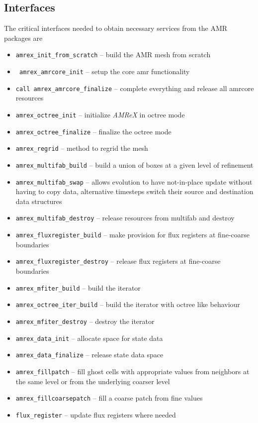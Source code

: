 \documentclass{article}
\newcommand{\code}[1]{{\tt#1}}
\newcommand{\amrex}{{\it AMReX}\xspace}
\begin{document}
\subsection{Interfaces}
\label{sec:amrex-interfaces}
The critical interfaces needed to obtain necessary services from the
AMR packages are
\begin{itemize}
\item \code{amrex\_init\_from\_scratch} -- build the AMR mesh from
  scratch
\item \code{ amrex\_amrcore\_init} -- setup the core amr functionality
\item \code{call amrex\_amrcore\_finalize} -- complete everything and
  release all amrcore resources
\item \code{amrex\_octree\_init} -- initialize \amrex in octree mode
\item \code{amrex\_octree\_finalize} -- finalize the octree mode
\item \code{amrex\_regrid} -- method to regrid the mesh
\item \code{amrex\_multifab\_build} -- build a union of boxes at a given level
of refinement
\item \code{amrex\_multifab\_swap} -- allows evolution to have
  not-in-place update without having to copy data, alternative
  timesteps switch their source and destination data structures
\item \code{amrex\_multifab\_destroy} -- release resources from multifab
  and destroy
\item \code{amrex\_fluxregister\_build} -- make provision for flux
  registers at fine-coarse boundaries
\item \code{amrex\_fluxregister\_destroy} -- release flux 
  registers at fine-coarse boundaries
\item \code{amrex\_mfiter\_build} -- build the iterator 
\item \code{amrex\_octree\_iter\_build} -- build the iterator with octree like behaviour
\item \code{amrex\_mfiter\_destroy} -- destroy the iterator
\item \code{amrex\_data\_init} -- allocate space for state data
\item \code{amrex\_data\_finalize} -- release state data space
\item \code{amrex\_fillpatch} -- fill ghost cells with appropriate values
  from neighbors at the same level or from the underlying coarser
  level
\item \code{amrex\_fillcoarsepatch} -- fill a coarse patch from fine values
\item \code{flux\_register} -- update flux registers where needed
\end{itemize}
\end{document}

